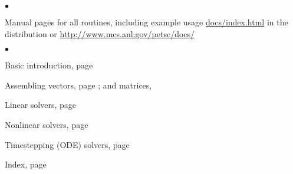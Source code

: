
%

\medskip\medskip


\medskip


\begin{list}{$\bullet$}
{
\setlength{\itemsep}{-.020in} 
\setlength{\topsep}{0in} 
\setlength{\partopsep}{0in}
}
\item Manual pages for all routines, including example usage
\href{index.html}{docs/index.html} in the distribution or
\href{http://www.mcs.anl.gov/petsc/docs/}{http://www.mcs.anl.gov/petsc/docs/}

\end{list}

\medskip
{}
\begin{list}{$\bullet$}
{
\setlength{\itemsep}{-.02in} 
\setlength{\topsep}{.02in} 
\setlength{\partopsep}{0in}
}
\item Basic introduction, page \pageref{sec_gettingstarted}
\item Assembling vectors, page \pageref{sec_vecbasic}; and matrices, \pageref{chapter_matrices}
\item Linear solvers, page \pageref{ch_ksp}
\item Nonlinear solvers, page \pageref{chapter_snes}
\item Timestepping (ODE) solvers, page \pageref{chapter_ts}
\item Index, page \pageref{ch_index}
\end{list}

